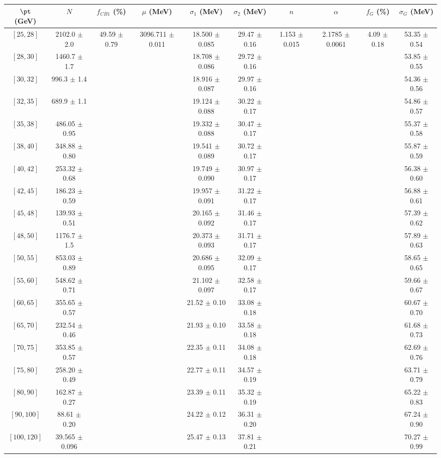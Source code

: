 \begin{tabular}{c||c|c|c|c|c|c|c|c|c}
$\pt$ (GeV) & $N$ & $f_{CB1}$ (\%)  & $\mu$ (MeV) & $\sigma_1$ (MeV) & $\sigma_2$ (MeV) & $n$ & $\alpha$ & $f_G$ (\%) & $\sigma_G$ (MeV) \\
\hline
$[25, 28]$ & 2102.0 $\pm$ 2.0 & \multirow{19}{*}{49.59 $\pm$ 0.79} & \multirow{19}{*}{3096.711 $\pm$ 0.011} & 18.500 $\pm$ 0.085 & 29.47 $\pm$ 0.16 & \multirow{19}{*}{1.153 $\pm$ 0.015} & \multirow{19}{*}{2.1785 $\pm$ 0.0061} & \multirow{19}{*}{4.09 $\pm$ 0.18} & 53.35 $\pm$ 0.54\\
$[28, 30]$ & 1460.7 $\pm$ 1.7 &  &  & 18.708 $\pm$ 0.086 & 29.72 $\pm$ 0.16 &  &  &  & 53.85 $\pm$ 0.55\\
$[30, 32]$ & 996.3 $\pm$ 1.4 &  &  & 18.916 $\pm$ 0.087 & 29.97 $\pm$ 0.16 &  &  &  & 54.36 $\pm$ 0.56\\
$[32, 35]$ & 689.9 $\pm$ 1.1 &  &  & 19.124 $\pm$ 0.088 & 30.22 $\pm$ 0.17 &  &  &  & 54.86 $\pm$ 0.57\\
$[35, 38]$ & 486.05 $\pm$ 0.95 &  &  & 19.332 $\pm$ 0.088 & 30.47 $\pm$ 0.17 &  &  &  & 55.37 $\pm$ 0.58\\
$[38, 40]$ & 348.88 $\pm$ 0.80 &  &  & 19.541 $\pm$ 0.089 & 30.72 $\pm$ 0.17 &  &  &  & 55.87 $\pm$ 0.59\\
$[40, 42]$ & 253.32 $\pm$ 0.68 &  &  & 19.749 $\pm$ 0.090 & 30.97 $\pm$ 0.17 &  &  &  & 56.38 $\pm$ 0.60\\
$[42, 45]$ & 186.23 $\pm$ 0.59 &  &  & 19.957 $\pm$ 0.091 & 31.22 $\pm$ 0.17 &  &  &  & 56.88 $\pm$ 0.61\\
$[45, 48]$ & 139.93 $\pm$ 0.51 &  &  & 20.165 $\pm$ 0.092 & 31.46 $\pm$ 0.17 &  &  &  & 57.39 $\pm$ 0.62\\
$[48, 50]$ & 1176.7 $\pm$ 1.5 &  &  & 20.373 $\pm$ 0.093 & 31.71 $\pm$ 0.17 &  &  &  & 57.89 $\pm$ 0.63\\
$[50, 55]$ & 853.03 $\pm$ 0.89 &  &  & 20.686 $\pm$ 0.095 & 32.09 $\pm$ 0.17 &  &  &  & 58.65 $\pm$ 0.65\\
$[55, 60]$ & 548.62 $\pm$ 0.71 &  &  & 21.102 $\pm$ 0.097 & 32.58 $\pm$ 0.17 &  &  &  & 59.66 $\pm$ 0.67\\
$[60, 65]$ & 355.65 $\pm$ 0.57 &  &  & 21.52 $\pm$ 0.10 & 33.08 $\pm$ 0.18 &  &  &  & 60.67 $\pm$ 0.70\\
$[65, 70]$ & 232.54 $\pm$ 0.46 &  &  & 21.93 $\pm$ 0.10 & 33.58 $\pm$ 0.18 &  &  &  & 61.68 $\pm$ 0.73\\
$[70, 75]$ & 353.85 $\pm$ 0.57 &  &  & 22.35 $\pm$ 0.11 & 34.08 $\pm$ 0.18 &  &  &  & 62.69 $\pm$ 0.76\\
$[75, 80]$ & 258.20 $\pm$ 0.49 &  &  & 22.77 $\pm$ 0.11 & 34.57 $\pm$ 0.19 &  &  &  & 63.71 $\pm$ 0.79\\
$[80, 90]$ & 162.87 $\pm$ 0.27 &  &  & 23.39 $\pm$ 0.11 & 35.32 $\pm$ 0.19 &  &  &  & 65.22 $\pm$ 0.83\\
$[90, 100]$ & 88.61 $\pm$ 0.20 &  &  & 24.22 $\pm$ 0.12 & 36.31 $\pm$ 0.20 &  &  &  & 67.24 $\pm$ 0.90\\
$[100, 120]$ & 39.565 $\pm$ 0.096 &  &  & 25.47 $\pm$ 0.13 & 37.81 $\pm$ 0.21 &  &  &  & 70.27 $\pm$ 0.99\\
\end{tabular}
